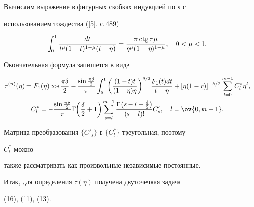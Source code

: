 Вычислим выражение в фигурных скобках индукцией по $s$ с 


использованием тождества ([5], с.\,489) 


$$ 


\int^1_0\frac{dt}{t^\mu(1-t)^{1-\mu}(t-\eta)}= 


\frac{\pi\ctg\pi\mu}{\eta^\mu(1-\eta)^{1-\mu}},\quad 0<\mu<1. 


$$ 


Окончательная формула запишется в виде 


\begin{gather} 


\tau^{(n)}(\eta)=F_1(\eta)\cos\frac{\pi\delta}{2}- 


\frac{\sin\frac{\pi\delta}{2}}{\pi}\int^1_0\bigg( 


\frac{(1-t)t}{(1-\eta)\eta}\bigg)^{\delta/2} 


\frac{F_1(t)dt}{t-\eta}+[\eta(1-\eta)]^{-\delta/2} 


\sum^{m-1}_{l=0}C^*_l \eta^l, \\ 


% 


C^*_l=-\frac{\sin\frac{\pi\delta}{2}}{\pi}\Gamma 


\bigg(\frac{\delta}{2}+1 \bigg)\sum^{m-1}_{s=l} 


\frac{\Gamma\big(s-l-\frac{\delta}{2}\big)}{(s-l)!}C'_s,\quad 


l=\ov{0,m-1}.\notag 


\end{gather} 


Матрица преобразования $\{C'_s\}$ в $\{C^*_l\}$ треугольная, поэтому 


$C^*_l$ можно 


также рассматривать как произвольные независимые постоянные. 


 


Итак, для определения $\tau(\eta)$ получена двуточечная задача 


(16), (11), (13). 


 


